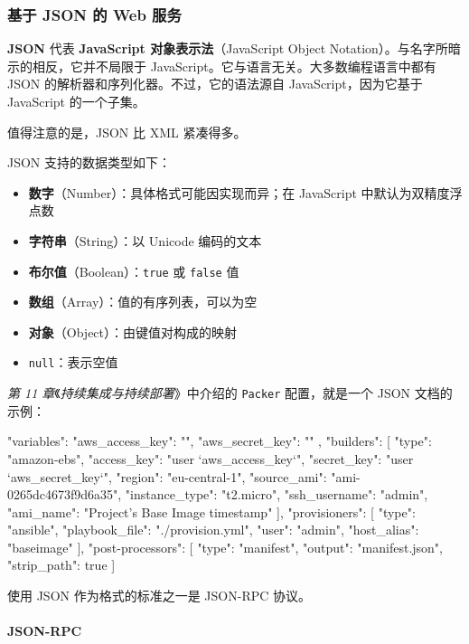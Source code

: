 \subsubsection{基于 JSON 的 Web 服务}

\label{idx:1609}
\label{idx:1610}
\label{idx:1611}
\textbf{JSON} 代表 \textbf{JavaScript 对象表示法}（JavaScript Object Notation）。与名字所暗示的相反，它并不局限于 JavaScript。它与语言无关。大多数编程语言中都有 JSON 的解析器和序列化器。不过，它的语法源自 JavaScript，因为它基于 JavaScript 的一个子集。

值得注意的是，JSON 比 XML 紧凑得多。

\label{idx:1612}
JSON 支持的数据类型如下：

\begin{itemize}
\item \textbf{数字}（Number）：具体格式可能因实现而异；在 JavaScript 中默认为双精度浮点数
\item \textbf{字符串}（String）：以 Unicode 编码的文本
\item \textbf{布尔值}（Boolean）：\texttt{true} 或 \texttt{false} 值
\item \textbf{数组}（Array）：值的有序列表，可以为空
\item \textbf{对象}（Object）：由键值对构成的映射
\item \texttt{null}：表示空值
\end{itemize}

\label{idx:1613}
\emph{第 11 章}《\emph{持续集成与持续部署}》中介绍的 \texttt{Packer} 配置，就是一个 JSON 文档的示例：

\begin{codebox}[json]
{
  "variables": {
    "aws_access_key": "",
    "aws_secret_key": ""
  },
  "builders": [{
    "type": "amazon-ebs",
    "access_key": "{{user `aws_access_key`}}",
    "secret_key": "{{user `aws_secret_key`}}",
    "region": "eu-central-1",
    "source_ami": "ami-0265dc4673f9d6a35",
    "instance_type": "t2.micro",
    "ssh_username": "admin",
    "ami_name": "Project's Base Image {{timestamp}}"
  }],
  "provisioners": [{
    "type": "ansible",
    "playbook_file": "./provision.yml",
    "user": "admin",
    "host_alias": "baseimage"
  }],
  "post-processors": [{
    "type": "manifest",
    "output": "manifest.json",
    "strip_path": true
  }]
}
\end{codebox}

\label{idx:1614}
使用 JSON 作为格式的标准之一是 JSON-RPC 协议。

\paragraph{JSON-RPC}

